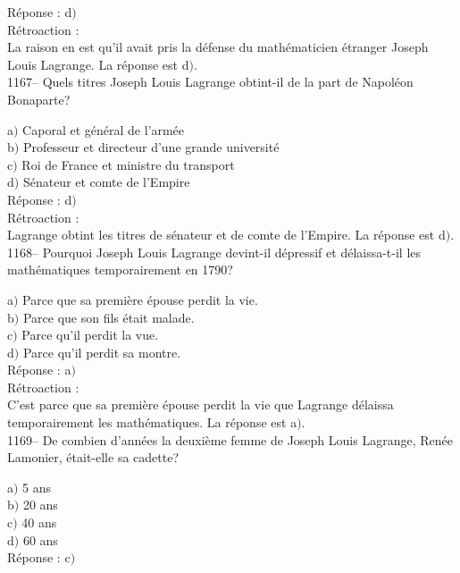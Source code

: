﻿\documentclass[letterpaper, 12pt]{article}
\begin{document}
R\'eponse : d$)$\\

R\'etroaction : \\
La raison en est qu'il avait pris la d\'efense du math\'ematicien
\'etranger Joseph Louis Lagrange.
La r\'eponse est d$)$.\\

1167-- Quels titres Joseph Louis Lagrange obtint-il de la part de
Napol\'eon Bonaparte?

a$)$ Caporal et g\'en\'eral de l'arm\'ee \\
b$)$ Professeur et directeur d'une grande universit\'e \\
c$)$ Roi de France et ministre du transport \\
d$)$ S\'enateur et comte de l'Empire\\

R\'eponse : d$)$\\

R\'etroaction : \\
Lagrange obtint les titres de s\'enateur et de comte de l'Empire.
La r\'eponse est d$)$.\\

1168-- Pourquoi Joseph Louis Lagrange devint-il d\'epressif et
d\'elaissa-t-il les math\'ematiques temporairement en 1790?

a$)$ Parce que sa premi\`ere \'epouse perdit la vie. \\
b$)$ Parce que son fils \'etait malade. \\
c$)$ Parce qu'il perdit la vue. \\
d$)$ Parce qu'il perdit sa montre.\\

R\'eponse : a$)$\\

R\'etroaction : \\
C'est parce que sa premi\`ere \'epouse perdit la vie que Lagrange
d\'elaissa temporairement les math\'ematiques.
La r\'eponse est a$)$.\\

1169-- De combien d'ann\'ees la deuxi\`eme femme de Joseph Louis
Lagrange, Ren\'ee Lamonier, \'etait-elle sa cadette?

a$)$ 5 ans \\
b$)$ 20 ans \\
c$)$ 40 ans \\
d$)$ 60 ans\\

R\'eponse : c$)$\\
\end{document}
